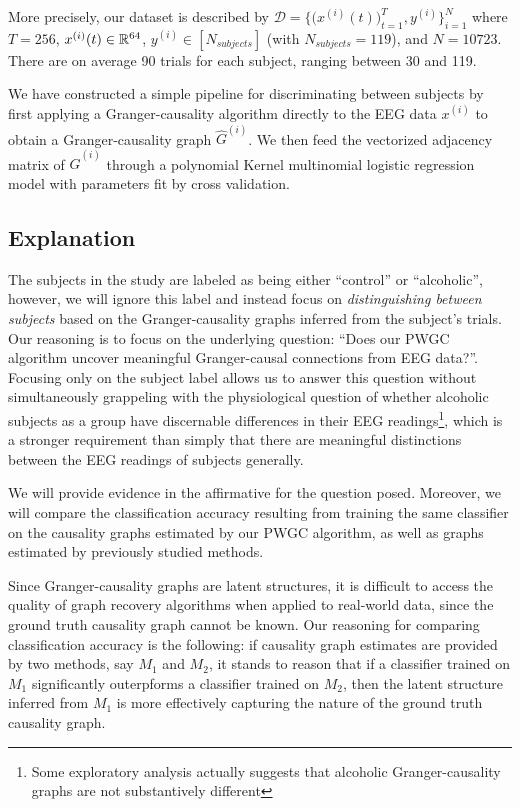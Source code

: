 \documentclass[12pt]{article}
\begin{document}
More precisely, our dataset is described by
$\mathcal{D} = \{\big(x^{(i)}(t)\big)_{t = 1}^T, y^{(i)} \}_{i = 1}^N$
where $T = 256$, $x^{(i)}(t) \in \mathbb{R}^{64}$,
$y^{(i)} \in [N_{subjects}]$ (with $N_{subjects} = 119$), and
$N = 10723$.  There are on average 90 trials for each subject, ranging
between 30 and 119.

We have constructed a simple pipeline for discriminating between
subjects by first applying a Granger-causality algorithm directly to
the EEG data $x^{(i)}$ to obtain a Granger-causality graph
$\widehat{G}^{(i)}$.  We then feed the vectorized adjacency matrix of
$\widehat{G}^{(i)}$ through a polynomial Kernel multinomial logistic
regression model with parameters fit by cross validation.

\subsection{Explanation}
The subjects in the study are labeled as being either ``control'' or
``alcoholic'', however, we will ignore this label and instead focus on
\textit{distinguishing between subjects} based on the
Granger-causality graphs inferred from the subject's trials.  Our
reasoning is to focus on the underlying question: ``Does our PWGC
algorithm uncover meaningful Granger-causal connections from EEG
data?''.  Focusing only on the subject label allows us to answer this
question without simultaneously grappeling with the physiological
question of whether alcoholic subjects as a group have discernable
differences in their EEG readings\footnote{Some exploratory analysis
  actually suggests that alcoholic Granger-causality graphs are not
  substantively different}, which is a stronger requirement than
simply that there are meaningful distinctions between the EEG readings
of subjects generally.

We will provide evidence in the affirmative for the question posed.
Moreover, we will compare the classification accuracy resulting from
training the same classifier on the causality graphs estimated by our
PWGC algorithm, as well as graphs estimated by previously studied
methods.

Since Granger-causality graphs are latent structures, it is difficult
to access the quality of graph recovery algorithms when applied to
real-world data, since the ground truth causality graph cannot be
known.  Our reasoning for comparing classification accuracy is the
following: if causality graph estimates are provided by two methods,
say $M_1$ and $M_2$, it stands to reason that if a classifier trained
on $M_1$ significantly outerpforms a classifier trained on $M_2$, then
the latent structure inferred from $M_1$ is more effectively capturing
the nature of the ground truth causality graph.
\end{document}
